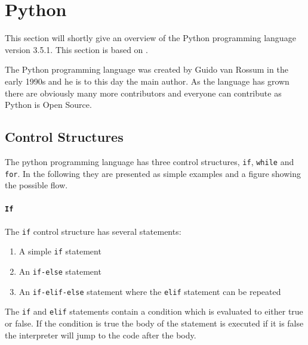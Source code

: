 \section{Python}\label{python}
This section will shortly give an overview of the Python programming language version 3.5.1.
This section is based on \citet{python_docs}.

The Python programming language was created by Guido van Rossum in the early 1990s and he is to this day the main author.
As the language has grown there are obviously many more contributors and everyone can contribute as Python is Open Source.

\subsection{Control Structures}\label{python:control_structures}
The python programming language has three control structures, \texttt{if}, \texttt{while} and \texttt{for}.
In the following they are presented as simple examples and a figure showing the possible flow.

\paragraph{\texttt{If}}
The \texttt{if} control structure has several statements:
\begin{enumerate}
\item A simple \texttt{if} statement
\item An \texttt{if-else} statement
\item An \texttt{if-elif-else} statement where the \texttt{elif} statement can be repeated
\end{enumerate}
The \texttt{if} and \texttt{elif} statements contain a condition which is evaluated to either true or false.
If the condition is true the body of the statement is executed if it is false the interpreter will jump to the code after the body.

